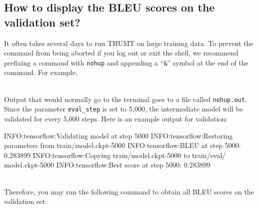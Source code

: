 \documentclass{article}
\begin{document}
\subsection{How to display the BLEU scores on the validation set?}
It often takes several days to run THUMT on large training data. To prevent the command from being aborted if you log out or exit the shell, we recommend prefixing a command with \verb|nohup| and appending a ``\verb|&|'' symbol at the end of the command. For example,
\\
\\
Output that would normally go to the terminal goes to a file called \verb|nohup.out|. Since the parameter \verb|eval_step| is set to 5,000, the intermediate model will be validated for every 5,000 steps. Here is an example output for validation:
\\
\begin{everbatim}
INFO:tensorflow:Validating model at step 5000
INFO:tensorflow:Restoring parameters from train/model.ckpt-5000
INFO:tensorflow:BLEU at step 5000: 0.283899
INFO:tensorflow:Copying train/model.ckpt-5000 to train/eval/
model.ckpt-5000
INFO:tensorflow:Best score at step 5000: 0.283899
\end{everbatim}
\\
Therefore, you may run the following command to obtain all BLEU scores on the validation set:
\\
\end{document}
